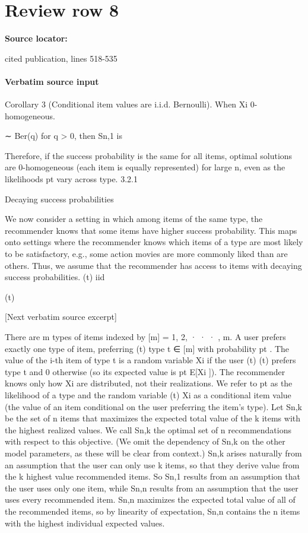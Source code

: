 \documentclass[10pt]{article}
\begin{document}
\section*{Review row 8}
\textbf{Source locator:} {\footnotesize\raggedright cited publication, lines 518-\allowbreak{}535\par}
\paragraph{Verbatim source input}
\begin{ReviewVerbatim}
Corollary 3 (Conditional item values are i.i.d. Bernoulli). When Xi
0-homogeneous.

∼ Ber(q) for q > 0, then Sn,1 is

Therefore, if the success probability is the same for all items, optimal solutions are 0-homogeneous (each
item is equally represented) for large n, even as the likelihoods pt vary across type.
3.2.1

Decaying success probabilities

We now consider a setting in which among items of the same type, the recommender knows that some items
have higher success probability. This maps onto settings where the recommender knows which items of a
type are most likely to be satisfactory, e.g., some action movies are more commonly liked than are others.
Thus, we assume that the recommender has access to items with decaying success probabilities.
(t) iid

(t)

[Next verbatim source excerpt]

There are m types of items indexed by [m] = {1, 2, · · · , m}. A user prefers exactly one type of item, preferring
(t)
type t ∈ [m] with probability pt . The value of the i-th item of type t is a random variable Xi if the user
(t)
(t)
prefers type t and 0 otherwise (so its expected value is pt E[Xi ]). The recommender knows only how Xi
are distributed, not their realizations. We refer to pt as the likelihood of a type and the random variable
(t)
Xi as a conditional item value (the value of an item conditional on the user preferring the item’s type).
Let Sn,k be the set of n items that maximizes the expected total value of the k items with the highest
realized values. We call Sn,k the optimal set of n recommendations with respect to this objective. (We omit
the dependency of Sn,k on the other model parameters, as these will be clear from context.)
Sn,k arises naturally from an assumption that the user can only use k items, so that they derive value
from the k highest value recommended items. So Sn,1 results from an assumption that the user uses only
one item, while Sn,n results from an assumption that the user uses every recommended item.
Sn,n maximizes the expected total value of all of the recommended items, so by linearity of expectation,
Sn,n contains the n items with the highest individual expected values.
\end{ReviewVerbatim}
\end{document}
